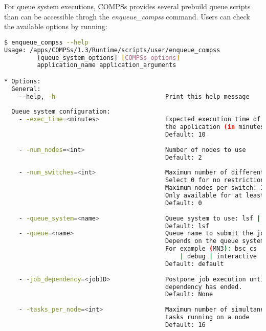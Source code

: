 For queue system executions, COMPSs provides several prebuild queue scripts than can be accessible throgh the \textit{enqueue\_compss}
command. Users can check the available options by running:
\begin{lstlisting}[language=bash]
$ enqueue_compss --help
Usage: /apps/COMPSs/1.3/Runtime/scripts/user/enqueue_compss 
         [queue_system_options] [COMPSs_options] 
         application_name application_arguments

* Options:
  General:
    --help, -h                              Print this help message
  
  Queue system configuration:
    - -exec_time=<minutes>                  Expected execution time of 
                                            the application (in minutes)
                                            Default: 10
                                            
    - -num_nodes=<int>                      Number of nodes to use
                                            Default: 2
                                            
    - -num_switches=<int>                   Maximum number of different switches.
                                            Select 0 for no restrictions.
                                            Maximum nodes per switch: 18
                                            Only available for at least 4 nodes. 
                                            Default: 0 
                                            
    - -queue_system=<name>                  Queue system to use: lsf | pbs | slurm
                                            Default: lsf
    - -queue=<name>                         Queue name to submit the job. 
                                            Depends on the queue system.
                                            For example (MN3): bsc_cs | bsc_debug
                                                | debug | interactive
                                            Default: default
                                            
    - -job_dependency=<jobID>               Postpone job execution until the job
                                            dependency has ended.
                                            Default: None
                                            
    - -tasks_per_node=<int>                 Maximum number of simultaneous
                                            tasks running on a node
                                            Default: 16
                                            

\end{lstlisting}
